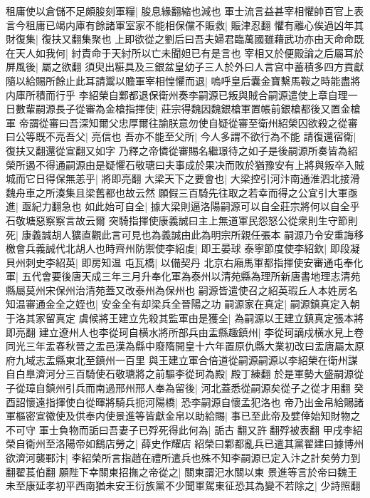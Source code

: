 租庸使以倉儲不足頗朘刻軍糧|{
	朘息緣翻縮也減也}
軍士流言益甚宰相懼帥百官上表言今租庸已竭内庫有餘諸軍室家不能相保儻不賑救|{
	賑津忍翻}
懼有離心俟過凶年其財復集|{
	復扶又翻集聚也}
上即欲從之劉后曰吾夫婦君臨萬國雖藉武功亦由天命命既在天人如我何|{
	紂責命于天紂所以亡未聞妲已有是言也}
宰相又於便殿論之后屬耳於屏風後|{
	屬之欲翻}
須臾出糚具及三銀盆皇幼子三人於外曰人言宫中蓄積多四方貢獻隨以給賜所餘止此耳請鬻以贍軍宰相惶懼而退|{
	嗚呼皇后囊金寶繫馬鞍之時能盡將内庫所積而行乎}
李紹榮自鄴都退保衛州奏李嗣源已叛與賊合嗣源遣使上章自理一日數輩嗣源長子從審為金槍指揮使|{
	莊宗得魏因魏銀槍軍置帳前銀槍都後又置金槍軍}
帝謂從審曰吾深知爾父忠厚爾往諭朕意勿使自疑從審至衛州紹榮囚欲殺之從審曰公等既不亮吾父|{
	亮信也}
吾亦不能至父所|{
	今人多謂不欲行為不能}
請復還宿衛|{
	復扶又翻還從宣翻又如字}
乃釋之帝憐從審賜名繼璟待之如子是後嗣源所奏皆為紹榮所遏不得通嗣源由是疑懼石敬瑭曰夫事成於果决而敗於猶豫安有上將與叛卒入賊城而它日得保無恙乎|{
	將即亮翻}
大梁天下之要會也|{
	大梁控引河汴南通淮泗北接滑魏舟車之所湊集且梁舊都也故云然}
願假三百騎先往取之若幸而得之公宜引大軍亟進|{
	亟紀力翻急也}
如此始可自全|{
	據大梁則逼洛陽嗣源可以自全莊宗將何以自全乎石敬塘惡察察言故云爾}
突騎指揮使康義誠曰主上無道軍民怨怒公從衆則生守節則死|{
	康義誠胡人獷直觀此言可見也為義誠由此為明宗所親任張本}
嗣源乃令安重誨移檄會兵義誠代北胡人也時齊州防禦使李紹䖍|{
	即王晏球}
泰寧節度使李紹欽|{
	即段凝}
貝州刺史李紹英|{
	即房知温}
屯瓦橋|{
	以備契丹}
北京右廂馬軍都指揮使安審通屯奉化軍|{
	五代會要後唐天成三年三月升奉化軍為泰州以清苑縣為理所新唐書地理志清苑縣屬莫州宋保州治清苑蓋又改泰州為保州也}
嗣源皆遣使召之紹英瑕丘人本姓房名知温審通金全之姪也|{
	安金全有却梁兵全晉陽之功}
嗣源家在真定|{
	嗣源鎮真定入朝于洛其家留真定}
虞候將王建立先殺其監軍由是獲全|{
	為嗣源以王建立鎮真定張本將即亮翻}
建立遼州人也李從珂自横水將所部兵由盂縣趣鎮州|{
	李從珂謫戍横水見上卷同光三年盂春秋晉之盂邑漢為縣中廢隋開皇十六年置原仇縣大業初改曰盂唐屬太原府九域志盂縣東北至鎮州一百里}
與王建立軍合倍道從嗣源嗣源以李紹榮在衛州謀自白臯濟河分三百騎使石敬瑭將之前驅李從珂為殿|{
	殿丁練翻}
於是軍勢大盛嗣源從子從璋自鎮州引兵而南過邢州邢人奉為留後|{
	河北蓋悉從嗣源矣從子之從才用翻}
癸酉詔懷遠指揮使白從暉將騎兵扼河陽橋|{
	恐李嗣源自懷孟犯洛也}
帝乃出金帛給賜諸軍樞密宣徽使及供奉内使景進等皆獻金帛以助給賜|{
	事已至此帝及嬖倖始知財物之不可守}
軍士負物而詬曰吾妻子已殍死得此何為|{
	詬古翻又許翻殍被表翻}
甲戌李紹榮自衛州至洛陽帝如鷂店勞之|{
	薛史作耀店}
紹榮曰鄴都亂兵已遣其黨翟建曰據博州欲濟河襲鄆汴|{
	李紹榮所言指趙在禮所遣兵也殊不知李嗣源已定入汴之計矣勞力到翻翟萇伯翻}
願陛下幸關東招撫之帝從之|{
	關東謂汜水關以東}
景進等言於帝曰魏王未至康延孝初平西南猶未安王衍族黨不少聞軍駕東征恐其為變不若除之|{
	少詩照翻}
